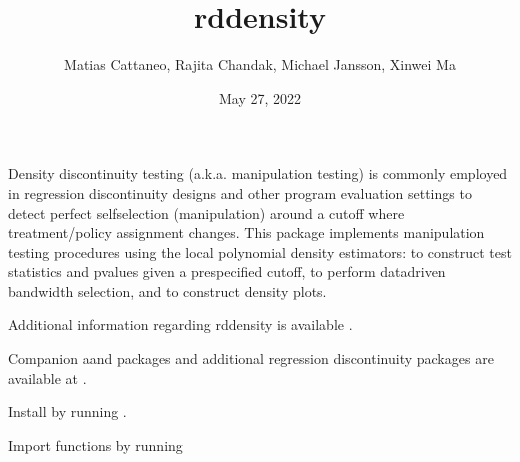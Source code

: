 \documentclass[letterpaper,10pt,english]{sphinxmanual}
\title{rddensity}
\date{May 27, 2022}
\author{Matias Cattaneo, Rajita Chandak, Michael Jansson, Xinwei Ma}
\begin{document}
\pagestyle{empty}
\sphinxmaketitle
\pagestyle{plain}
\sphinxtableofcontents
\pagestyle{normal}
\label{\detokenize{index::doc}}


\sphinxAtStartPar
Density discontinuity testing (a.k.a. manipulation testing)
is commonly employed in regression discontinuity designs
and other program evaluation settings to detect perfect self\sphinxhyphen{}selection (manipulation)
around a cutoff where treatment/policy assignment changes.
This package implements manipulation testing procedures using
the local polynomial density estimators:
 to construct test statistics and p\sphinxhyphen{}values given a prespecified cutoff,
 to perform data\sphinxhyphen{}driven bandwidth selection,
and  to construct density plots.

\sphinxAtStartPar
Additional information regarding rddensity is available .

\sphinxAtStartPar
Companion  aand  packages
and additional regression discontinuity packages
are available at .

\sphinxAtStartPar
Install  by running
.

\sphinxAtStartPar
Import functions by running

\begin{sphinxVerbatim}[commandchars=\\\{\}]
   
\end{sphinxVerbatim}

\begin{sphinxVerbatim}[commandchars=\\\{\}]
   
\end{sphinxVerbatim}

\begin{sphinxVerbatim}[commandchars=\\\{\}]
   
\end{sphinxVerbatim}
\end{document}
